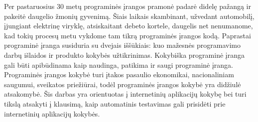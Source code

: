 Per pastaruosius 30 metų programinės įrangos pramonė padarė didelę pažangą ir pakeitė daugelio žmonių gyvenimą. Šiais laikais skambinant, užvedant automobilį, įjungiant elektrinę viryklę, atsiskaitant debeto kortele, daugelis net nenumanome, kad tokių procesų metu vykdome tam tikrą programinės įrangos kodą. Paprastai programinė įranga susiduria su dvejais iššūkiais: kuo mažesnės programavimo darbų išlaidos ir produkto kokybės užtikrinimas. Kokybiška programinė įranga gali būti apibūdinama kaip naudinga, patikima ir saugi programinė įranga. Programinės įrangos kokybė turi įtakos pasaulio ekonomikai, nacionaliniam saugumui, sveikatos priežiūrai, todėl programinės įrangos kokybė yra didžiulė atsakomybė. Šis darbas yra orientuotas į internetinių aplikacijų kokybę bei turi tikslą atsakyti į klausimą, kaip automatinis testavimas gali prisidėti prie internetinių aplikacijų kokybės.